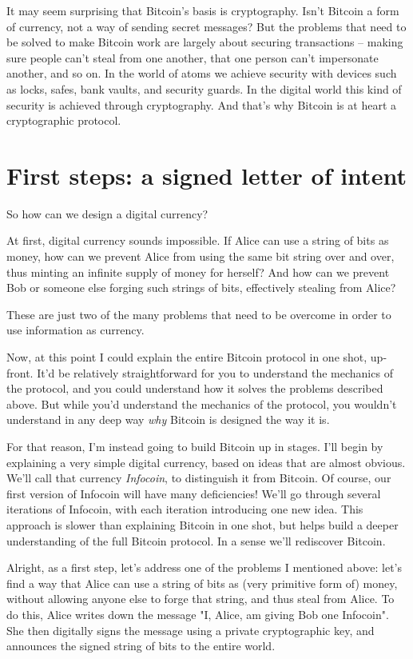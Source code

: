 \documentclass[12pt]{book}
\newcounter{problem}[chapter]
\begin{document}
%
%
It may seem surprising that Bitcoin's basis is cryptography.  Isn't
Bitcoin a form of currency, not a way of sending secret messages?  But
the problems that need to be solved to make Bitcoin work are largely
about securing transactions -- making sure people can't steal from one
another, that one person can't impersonate another, and so on.  In the
world of atoms we achieve security with devices such as locks, safes,
bank vaults, and security guards.  In the digital world this kind of
security is achieved through cryptography.  And that's why Bitcoin is
at heart a cryptographic protocol.

\section{First steps: a signed letter of intent}

So how can we design a digital currency?  

At first, digital currency sounds impossible.  If Alice can use a
string of bits as money, how can we prevent Alice from using the same
bit string over and over, thus minting an infinite supply of money for
herself?  And how can we prevent Bob or someone else forging such
strings of bits, effectively stealing from Alice?

These are just two of the many problems that need to be overcome in
order to use information as currency.

Now, at this point I could explain the entire Bitcoin protocol in one
shot, up-front.  It'd be relatively straightforward for you to
understand the mechanics of the protocol, and you could understand how
it solves the problems described above.  But while you'd understand
the mechanics of the protocol, you wouldn't understand in any deep way
\emph{why} Bitcoin is designed the way it is.

For that reason, I'm instead going to build Bitcoin up in stages.
I'll begin by explaining a very simple digital currency, based on
ideas that are almost obvious.  We'll call that currency
\emph{Infocoin}, to distinguish it from Bitcoin.  Of course, our first
version of Infocoin will have many deficiencies!  We'll go through
several iterations of Infocoin, with each iteration introducing one
new idea.  This approach is slower than explaining Bitcoin in one
shot, but helps build a deeper understanding of the full Bitcoin
protocol.  In a sense we'll rediscover Bitcoin.

Alright, as a first step, let's address one of the problems I
mentioned above: let's find a way that Alice can use a string of bits
as (very primitive form of) money, without allowing anyone else to
forge that string, and thus steal from Alice.  To do this, Alice
writes down the message "I, Alice, am giving Bob one Infocoin".  She
then digitally signs the message using a private cryptographic key,
and announces the signed string of bits to the entire world.
\end{document}
